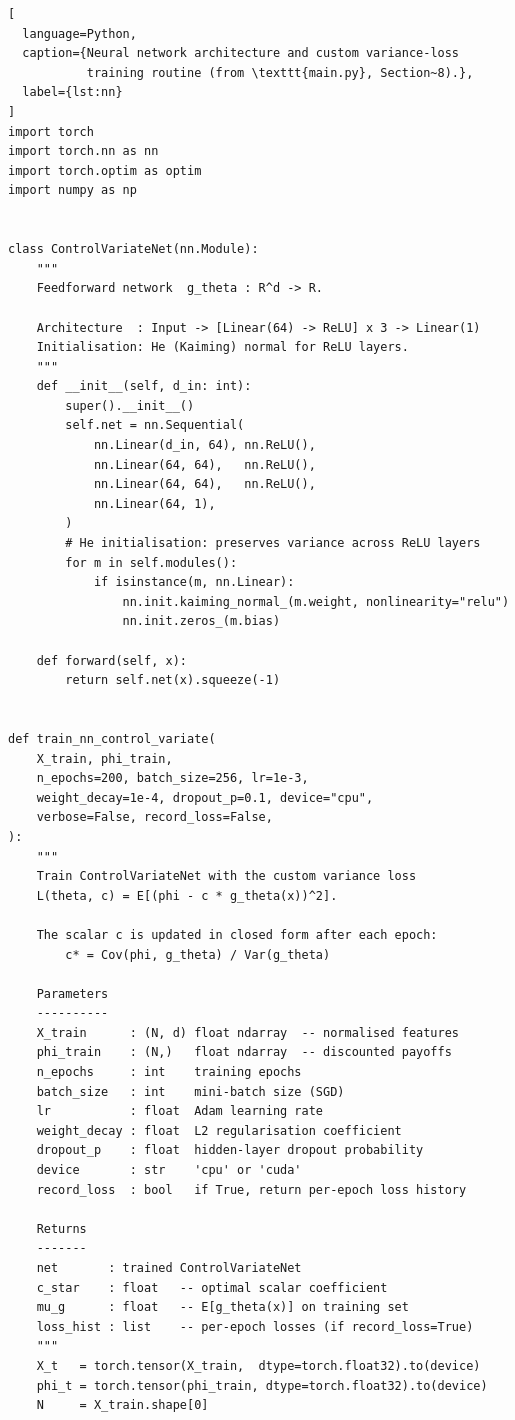 \begin{lstlisting}[
  language=Python,
  caption={Neural network architecture and custom variance-loss
           training routine (from \texttt{main.py}, Section~8).},
  label={lst:nn}
]
import torch
import torch.nn as nn
import torch.optim as optim
import numpy as np


class ControlVariateNet(nn.Module):
    """
    Feedforward network  g_theta : R^d -> R.

    Architecture  : Input -> [Linear(64) -> ReLU] x 3 -> Linear(1)
    Initialisation: He (Kaiming) normal for ReLU layers.
    """
    def __init__(self, d_in: int):
        super().__init__()
        self.net = nn.Sequential(
            nn.Linear(d_in, 64), nn.ReLU(),
            nn.Linear(64, 64),   nn.ReLU(),
            nn.Linear(64, 64),   nn.ReLU(),
            nn.Linear(64, 1),
        )
        # He initialisation: preserves variance across ReLU layers
        for m in self.modules():
            if isinstance(m, nn.Linear):
                nn.init.kaiming_normal_(m.weight, nonlinearity="relu")
                nn.init.zeros_(m.bias)

    def forward(self, x):
        return self.net(x).squeeze(-1)


def train_nn_control_variate(
    X_train, phi_train,
    n_epochs=200, batch_size=256, lr=1e-3,
    weight_decay=1e-4, dropout_p=0.1, device="cpu",
    verbose=False, record_loss=False,
):
    """
    Train ControlVariateNet with the custom variance loss
    L(theta, c) = E[(phi - c * g_theta(x))^2].

    The scalar c is updated in closed form after each epoch:
        c* = Cov(phi, g_theta) / Var(g_theta)

    Parameters
    ----------
    X_train      : (N, d) float ndarray  -- normalised features
    phi_train    : (N,)   float ndarray  -- discounted payoffs
    n_epochs     : int    training epochs
    batch_size   : int    mini-batch size (SGD)
    lr           : float  Adam learning rate
    weight_decay : float  L2 regularisation coefficient
    dropout_p    : float  hidden-layer dropout probability
    device       : str    'cpu' or 'cuda'
    record_loss  : bool   if True, return per-epoch loss history

    Returns
    -------
    net       : trained ControlVariateNet
    c_star    : float   -- optimal scalar coefficient
    mu_g      : float   -- E[g_theta(x)] on training set
    loss_hist : list    -- per-epoch losses (if record_loss=True)
    """
    X_t   = torch.tensor(X_train,  dtype=torch.float32).to(device)
    phi_t = torch.tensor(phi_train, dtype=torch.float32).to(device)
    N     = X_train.shape[0]


\end{lstlisting}
